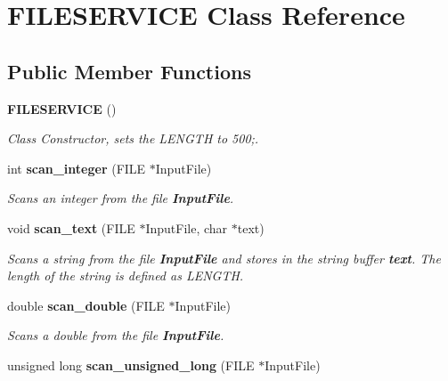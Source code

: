 \section{FILESERVICE Class Reference}
\label{classFILESERVICE}
\subsection*{Public Member Functions}
\begin{CompactItemize}
\item 
{\bf FILESERVICE} ()\label{classFILESERVICE_67f21291e1a07057dcd4ca73ef918b8e}

\begin{CompactList}\small\item\em Class Constructor, sets the {\em LENGTH\/} to 500;. \item\end{CompactList}\item 
int {\bf scan\_\-integer} (FILE $\ast$InputFile)\label{classFILESERVICE_6938ce3ccef9338e9cd556efce20166a}

\begin{CompactList}\small\item\em Scans an integer from the file {\bf InputFile}. \item\end{CompactList}\item 
void {\bf scan\_\-text} (FILE $\ast$InputFile, char $\ast$text)\label{classFILESERVICE_b8ad626346c8b0a433f0ef5ae499b450}

\begin{CompactList}\small\item\em Scans a string from the file {\bf InputFile} and stores in the string buffer {\bf text}. The length of the string is defined as LENGTH. \item\end{CompactList}\item 
double {\bf scan\_\-double} (FILE $\ast$InputFile)\label{classFILESERVICE_2d304e19c22caf50349f6e12a3456053}

\begin{CompactList}\small\item\em Scans a double from the file {\bf InputFile}. \item\end{CompactList}\item 
unsigned long {\bf scan\_\-unsigned\_\-long} (FILE $\ast$InputFile)\label{classFILESERVICE_226289aac2788371909c841e10941e10}


\end{CompactItemize}
